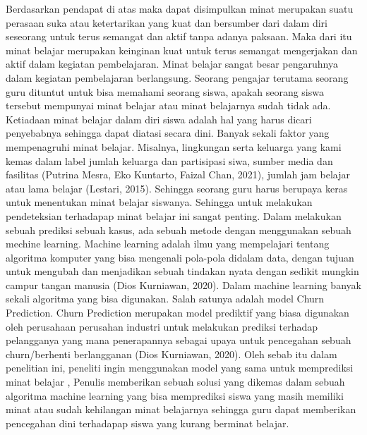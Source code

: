Berdasarkan pendapat di atas maka dapat disimpulkan minat merupakan suatu perasaan suka atau ketertarikan yang kuat dan bersumber dari dalam diri seseorang untuk terus semangat dan aktif tanpa adanya paksaan. Maka dari itu minat belajar merupakan keinginan kuat untuk terus semangat mengerjakan dan aktif dalam kegiatan pembelajaran. Minat belajar sangat besar pengaruhnya dalam kegiatan pembelajaran berlangsung.
Seorang pengajar terutama seorang guru dituntut untuk bisa memahami seorang siswa, apakah seorang siswa tersebut mempunyai minat belajar atau minat belajarnya sudah tidak ada. Ketiadaan minat belajar dalam diri siswa adalah hal yang harus dicari penyebabnya sehingga dapat diatasi secara dini. Banyak sekali faktor yang mempenagruhi minat belajar. Misalnya, lingkungan serta  keluarga yang kami kemas dalam label jumlah keluarga dan partisipasi siwa, sumber media dan fasilitas (Putrina Mesra, Eko Kuntarto, Faizal Chan, 2021), jumlah jam belajar atau lama belajar  (Lestari, 2015). Sehingga seorang guru harus berupaya keras untuk menentukan minat belajar siswanya. Sehingga untuk melakukan pendeteksian terhadapap minat belajar ini sangat penting.
Dalam melakukan sebuah prediksi sebuah kasus, ada sebuah metode  dengan menggunakan sebuah mechine learning. Machine learning adalah ilmu yang mempelajari tentang algoritma komputer yang bisa mengenali pola-pola didalam data, dengan tujuan untuk mengubah dan menjadikan sebuah tindakan nyata dengan sedikit mungkin campur tangan manusia (Dios Kurniawan, 2020). 
 Dalam machine learning banyak sekali algoritma yang bisa digunakan.  Salah satunya adalah model Churn Prediction. Churn Prediction merupakan model prediktif yang biasa digunakan oleh perusahaan perusahan industri untuk melakukan prediksi terhadap pelangganya yang mana penerapannya sebagai upaya untuk pencegahan sebuah churn/berhenti berlangganan (Dios Kurniawan, 2020). Oleh sebab itu dalam penelitian ini, peneliti ingin menggunakan model yang sama untuk memprediksi minat belajar , Penulis memberikan sebuah solusi yang dikemas dalam sebuah algoritma machine learning yang bisa memprediksi siswa yang masih memiliki minat atau sudah kehilangan minat belajarnya sehingga guru dapat memberikan pencegahan dini terhadapap siswa yang kurang berminat belajar.
